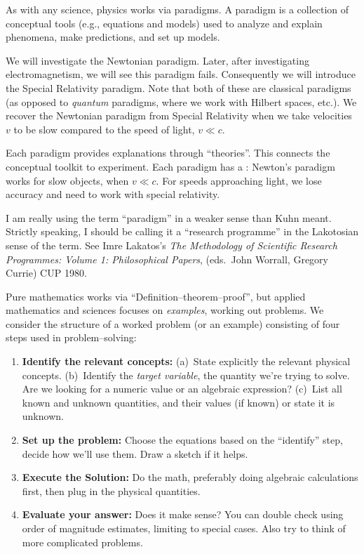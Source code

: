
 As with any science, physics works via
paradigms. A paradigm is a collection of conceptual tools (e.g.,
equations and models) used to analyze and explain phenomena, make
predictions, and set up models.

We will investigate the Newtonian paradigm. Later, after
investigating electromagnetism, we will see this paradigm
fails. Consequently we will introduce the Special Relativity
paradigm. Note that both of these are classical paradigms (as
opposed to \emph{quantum} paradigms, where we work with Hilbert
spaces, etc.). We recover the Newtonian paradigm from Special
Relativity when we take velocities $v$ to be slow compared to
the speed of light, $v\ll c$.

Each paradigm provides explanations through ``theories''. This
connects the conceptual toolkit to experiment. Each paradigm has
a :
Newton's paradigm works for slow objects, when $v\ll c$. For speeds
approaching light, we lose accuracy and need to work with special
relativity.

\begin{rmk}
I am really using the term ``paradigm'' in a weaker sense than Kuhn meant.
Strictly speaking, I should be calling it a ``research programme'' in the Lakotosian sense of the term.
See Imre Lakatos's \emph{The Methodology of Scientific Research Programmes: Volume 1: Philosophical Papers}, (eds.\ John Worrall, Gregory Currie) CUP 1980.
\end{rmk}

 Pure mathematics works via
``Definition--theorem--proof'', but applied mathematics and
sciences focuses on \emph{examples}, working out problems. We
consider the structure of a worked problem (or an example)
consisting of four steps used in problem--solving:
\begin{enumerate}
\item\textbf{Identify the relevant concepts:} (a)~State explicitly the
  relevant physical concepts. (b)~Identify the \emph{target variable},
  the quantity we're trying to solve. Are we looking for a
  numeric value or an algebraic expression? (c)~List all known and
  unknown quantities, and their values (if known) or state it is unknown.
\item\textbf{Set up the problem:} Choose the equations based on the
  ``identify'' step, decide how we'll use them. Draw a sketch if it
  helps.
\item\textbf{Execute the Solution:} Do the math, preferably doing
  algebraic calculations first, then plug in the physical
  quantities.
\item\textbf{Evaluate your answer:} Does it make sense? You can
  double check using order of magnitude estimates, limiting to special
  cases. Also try to think of more complicated problems.
\end{enumerate}

